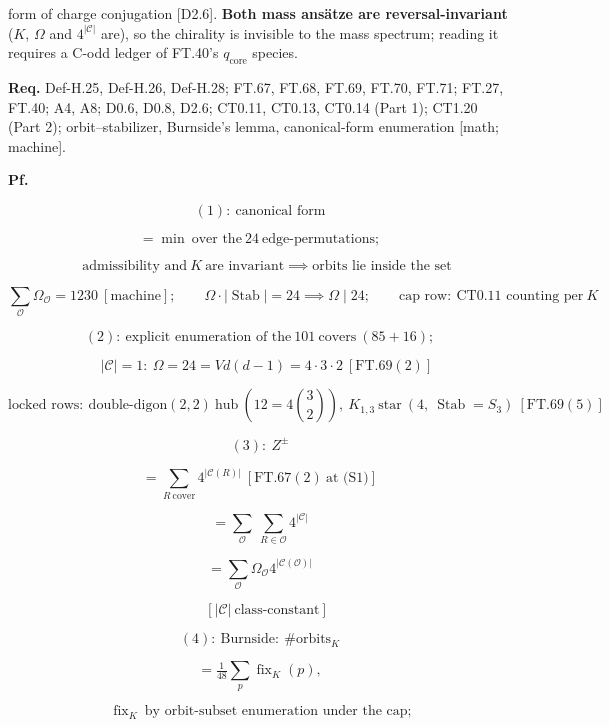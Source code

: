 \begin{theorem}
form of charge conjugation [D2.6]. \textbf{Both mass ansätze are reversal-invariant} ($K$, $\Omega$ and $4^{|\mathcal C|}$ are), so the chirality is invisible to the mass spectrum; reading it requires a C-odd ledger of FT.40's $q_{\mathrm{core}}$ species.

\textbf{Req.} Def-H.25, Def-H.26, Def-H.28; FT.67, FT.68, FT.69, FT.70, FT.71; FT.27, FT.40; A4, A8; D0.6, D0.8, D2.6; CT0.11, CT0.13, CT0.14 (Part 1); CT1.20 (Part 2); orbit–stabilizer, Burnside's lemma, canonical-form enumeration [math; machine].

\textbf{Pf.}

\[
(1):\ \text{canonical form}
\]

\[
= \min\ \text{over the}\ 24\ \text{edge-permutations};
\]

\[
\quad\text{admissibility and}\ K\ \text{are invariant}\implies\text{orbits lie inside the set}
\]

\[
\sum_{\mathcal O}\Omega_{\mathcal O}=1230\ [\text{machine}];\qquad\Omega\cdot|\operatorname{Stab}|=24\implies\Omega\mid24;\qquad\text{cap row}:\ \text{CT0.11 counting per}\ K
\]

\[
(2):\ \text{explicit enumeration of the}\ 101\ \text{covers}\ (85+16);
\]

\[
\quad |\mathcal C|=1:\ \Omega=24=Vd(d{-}1)=4\cdot3\cdot2\ [\mathrm{FT.69}(2)]
\]

\[
\text{locked rows}:\ \text{double-digon}(2,2)\ \text{hub}\ (12=4\binom32),\ K_{1,3}\ \text{star}\ (4,\ \operatorname{Stab}=S_3)\ [\mathrm{FT.69}(5)]
\]

\[
(3):\ Z^{\pm}
\]

\[
= \sum_{R\ \mathrm{cover}}4^{|\mathcal C(R)|}\ [\mathrm{FT.67}(2)\ \text{at (S1)}]
\]

\[
= \sum_{\mathcal O}\ \sum_{R\in\mathcal O}4^{|\mathcal C|}
\]

\[
= \sum_{\mathcal O}\Omega_{\mathcal O}4^{|\mathcal C(\mathcal O)|}
\]

\[
\quad [|\mathcal C|\ \text{class-constant}]
\]

\[
(4):\ \text{Burnside}:\ \#\text{orbits}_K
\]

\[
= \tfrac1{48}\sum_{p}\operatorname{fix}_K(p),
\]

\[
\ \operatorname{fix}_K\ \text{by orbit-subset enumeration under the cap};
\]


\end{theorem}
